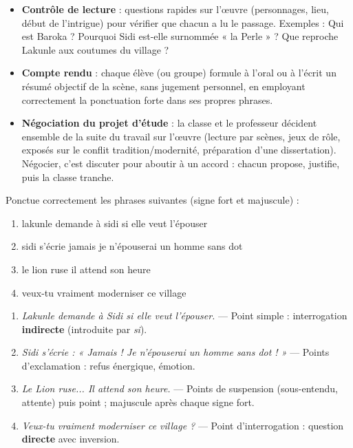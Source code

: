\documentclass[11pt]{article}
\newcounter{popsec}
\newcounter{popsub}
\newcommand{\courssub}[1]{%
  \stepcounter{popsub}%
  \par\vspace{9pt}\noindent{\popxbold\fontsize{11.5}{13}\selectfont\color{popink}{\color{poporange}\thepopsec.\thepopsub}\hspace{6pt}#1}\par\nopagebreak\vspace{4pt}
}
\begin{document}
\begin{itemize}
\item \textbf{Contrôle de lecture} : questions rapides sur l'œuvre (personnages, lieu, début de l'intrigue) pour vérifier que chacun a lu le passage. Exemples : Qui est Baroka ? Pourquoi Sidi est-elle surnommée « la Perle » ? Que reproche Lakunle aux coutumes du village ?
\item \textbf{Compte rendu} : chaque élève (ou groupe) formule à l'oral ou à l'écrit un résumé objectif de la scène, sans jugement personnel, en employant correctement la ponctuation forte dans ses propres phrases.
\item \textbf{Négociation du projet d'étude} : la classe et le professeur décident ensemble de la suite du travail sur l'œuvre (lecture par scènes, jeux de rôle, exposés sur le conflit tradition/modernité, préparation d'une dissertation). Négocier, c'est discuter pour aboutir à un accord : chacun propose, justifie, puis la classe tranche.
\end{itemize}

\courssub{Remédiation sur les acquis}

\begin{exercice}
Ponctue correctement les phrases suivantes (signe fort et majuscule) :
\begin{enumerate}
\item lakunle demande à sidi si elle veut l'épouser
\item sidi s'écrie jamais je n'épouserai un homme sans dot
\item le lion ruse il attend son heure
\item veux-tu vraiment moderniser ce village
\end{enumerate}
\end{exercice}

\begin{corrige}
\begin{enumerate}
\item \emph{Lakunle demande à Sidi si elle veut l'épouser.} — Point simple : interrogation \textbf{indirecte} (introduite par \emph{si}).
\item \emph{Sidi s'écrie : « Jamais ! Je n'épouserai un homme sans dot ! »} — Points d'exclamation : refus énergique, émotion.
\item \emph{Le Lion ruse... Il attend son heure.} — Points de suspension (sous-entendu, attente) puis point ; majuscule après chaque signe fort.
\item \emph{Veux-tu vraiment moderniser ce village ?} — Point d'interrogation : question \textbf{directe} avec inversion.
\end{enumerate}
\end{corrige}
\end{document}
